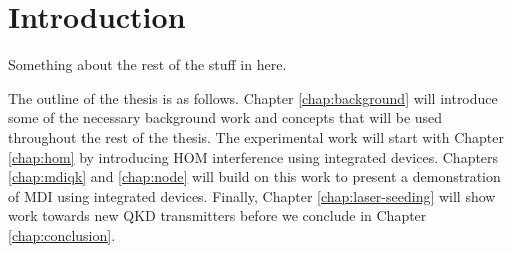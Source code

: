 %
%
\graphicspath{{./chapters/chapter01/fig01/}}

\let\textcircled=\pgftextcircled
\chapter{Introduction}
\label{chap:intro}


Something about the rest of the stuff in here.

\lipsum[1-7]
\lipsum[1-7]

The outline of the thesis is as follows. Chapter \ref{chap:background} will introduce some of the necessary background work and concepts that will be used throughout the rest of the thesis. The experimental work will start with Chapter \ref{chap:hom} by introducing \ac{HOM} interference using integrated devices. Chapters \ref{chap:mdiqk} and \ref{chap:node} will build on this work to present a demonstration of \ac{MDI} using integrated devices. Finally, Chapter \ref{chap:laser-seeding} will show work towards new \ac{QKD} transmitters before we conclude in Chapter \ref{chap:conclusion}.

